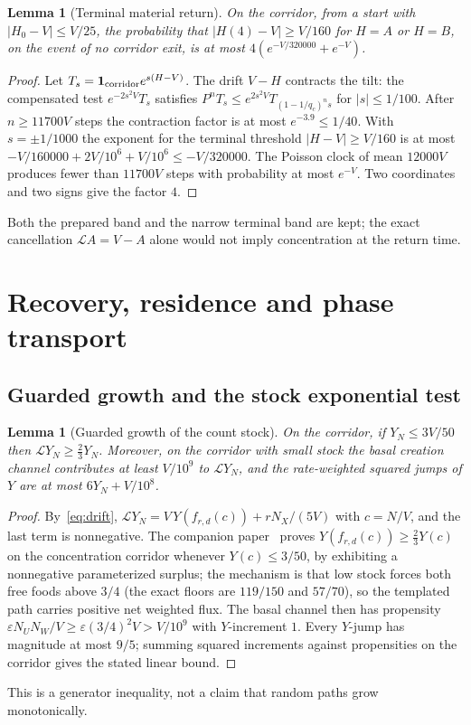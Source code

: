 \documentclass[11pt,a4paper]{article}
\theoremstyle{plain}
\newtheorem{lemma}[theorem]{Lemma}
\theoremstyle{definition}
\theoremstyle{remark}
\newcommand{\eps}{\varepsilon}
\newcommand{\Lgen}{\mathcal L}
\newcommand{\one}{\mathbf 1}
\begin{document}
\begin{lemma}[Terminal material return]\label{lem:terminal}
On the corridor, from a start with $|H_0-V|\le V/25$, the probability that $|H(4)-V|\ge V/160$ for $H=A$ or $H=B$, on the event of no corridor exit, is at most $4(e^{-V/320000}+e^{-V})$.
\end{lemma}
\begin{proof}
Let $T_s=\one_{\rm corridor}e^{s(H-V)}$. The drift $V-H$ contracts the tilt: the compensated test $e^{-2s^2V}T_s$ satisfies $P^nT_s\le e^{2s^2V}T_{(1-1/q_c)^ns}$ for $|s|\le1/100$. After $n\ge11700V$ steps the contraction factor is at most $e^{-3.9}\le1/40$. With $s=\pm1/1000$ the exponent for the terminal threshold $|H-V|\ge V/160$ is at most $-V/160000+2V/10^6+V/10^6\le-V/320000$. The Poisson clock of mean $12000V$ produces fewer than $11700V$ steps with probability at most $e^{-V}$. Two coordinates and two signs give the factor $4$.
\end{proof}
Both the prepared band and the narrow terminal band are kept; the exact cancellation $\Lgen A=V-A$ alone would not imply concentration at the return time.

\section{Recovery, residence and phase transport}\label{sec:recovery}

\subsection{Guarded growth and the stock exponential test}
\begin{lemma}[Guarded growth of the count stock]\label{lem:growth}
On the corridor, if $Y_N\le3V/50$ then $\Lgen Y_N\ge\tfrac23Y_N$. Moreover, on the corridor with small stock the basal creation channel contributes at least $V/10^9$ to $\Lgen Y_N$, and the rate-weighted squared jumps of $Y$ are at most $6Y_N+V/10^8$.
\end{lemma}
\begin{proof}
By~\eqref{eq:drift}, $\Lgen Y_N=V\,Y(f_{r,d}(c))+rN_X/(5V)$ with $c=N/V$, and the last term is nonnegative. The companion paper~\citep[Lemma~4.6]{recovery2026} proves $Y(f_{r,d}(c))\ge\tfrac23Y(c)$ on the concentration corridor whenever $Y(c)\le3/50$, by exhibiting a nonnegative parameterized surplus; the mechanism is that low stock forces both free foods above $3/4$ (the exact floors are $119/150$ and $57/70$), so the templated path carries positive net weighted flux. The basal channel then has propensity $\eps N_UN_W/V\ge\eps(3/4)^2V>V/10^9$ with $Y$-increment $1$. Every $Y$-jump has magnitude at most $9/5$; summing squared increments against propensities on the corridor gives the stated linear bound.
\end{proof}
This is a generator inequality, not a claim that random paths grow monotonically.
\end{document}
